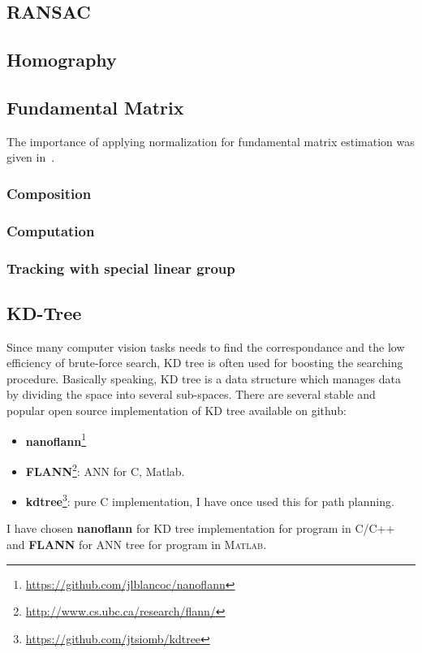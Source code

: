 \subsection{RANSAC}

\subsection{Homography}

\subsection{Fundamental Matrix}
The importance of applying normalization for fundamental matrix estimation was given in~\cite{hartley1995defence}.



\subsubsection{Composition}
\subsubsection{Computation}
\subsubsection{Tracking with special linear group}

\subsection{KD-Tree}
Since many computer vision tasks needs to find the correspondance and the low efficiency of brute-force search, KD tree is often used for boosting the searching procedure. Basically speaking, KD tree is a data structure which manages data by dividing the space into several sub-spaces. There are several stable and popular open source implementation of KD tree available on github:
\begin{itemize}
\item \textbf{nanoflann}\footnote{\url{https://github.com/jlblancoc/nanoflann}}
\item \textbf{FLANN}\footnote{\url{http://www.cs.ubc.ca/research/flann/}}: ANN for C, Matlab.
\item \textbf{kdtree}\footnote{\url{https://github.com/jtsiomb/kdtree}}: pure C implementation, I have once used this for path planning.
\end{itemize}
I have chosen \textbf{nanoflann} for KD tree implementation for program in \textsc{C/C++} and \textbf{FLANN} for ANN tree for program in \textsc{Matlab}.

